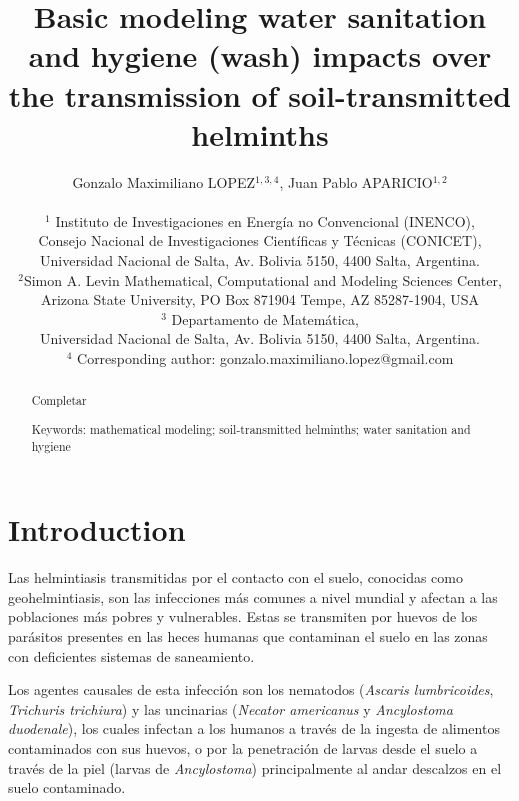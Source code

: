 \documentclass[12pt,a4paper]{article}
\title{Basic modeling water sanitation and hygiene (wash) impacts over the transmission of soil-transmitted helminths}
\author{Gonzalo Maximiliano LOPEZ$^{1,3,4}$, Juan Pablo APARICIO$^{1,2}$\\
	\\
	{\small $^1$ Instituto de Investigaciones en Energ\'ia no Convencional (INENCO),} \\ {\small Consejo Nacional de Investigaciones Cient\'ificas y T\'ecnicas (CONICET),}\\
	{\small Universidad Nacional de Salta, Av. Bolivia 5150, 4400 Salta, Argentina.}\\
	$^2${\small Simon A. Levin Mathematical, Computational and Modeling Sciences Center,} \\ {\small Arizona State University, PO Box 871904 Tempe, AZ 85287-1904, USA}\\
	{\small $^3$ Departamento de Matem\'atica,}\\{\small Universidad Nacional de Salta, Av. Bolivia 5150, 4400 Salta, Argentina.}\\
	{\small $^4$ Corresponding author: gonzalo.maximiliano.lopez@gmail.com}}
\date{}
\theoremstyle{plain}%
\theoremstyle{definition}
\theoremstyle{remark}
\begin{document}
\maketitle

\begin{abstract}
	Completar
	
	Keywords: mathematical modeling; soil-transmitted helminths; water sanitation and hygiene
\end{abstract}

\tableofcontents



\section{Introduction}
{\color{red}
%	
%	
%
	Las helmintiasis transmitidas por el contacto con el suelo, conocidas como geohelmintiasis, son las infecciones más comunes a nivel mundial y afectan a las poblaciones más pobres y vulnerables. 
	Estas se transmiten por huevos de los parásitos presentes en las heces humanas que contaminan el suelo en las zonas con deficientes sistemas de saneamiento.
	
	Los agentes causales de esta infección son los nematodos (\textit{Ascaris lumbricoides}, \textit{Trichuris trichiura}) y las uncinarias (\textit{Necator americanus} y \textit{Ancylostoma duodenale}), los cuales infectan a los humanos a través de la ingesta de alimentos contaminados con sus huevos, o por la penetración de larvas desde el suelo a través de la piel (larvas de \textit{Ancylostoma}) principalmente al andar descalzos en el suelo contaminado.
	
	
}
\end{document}

